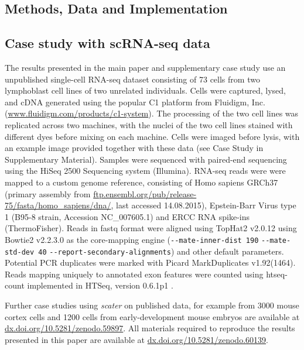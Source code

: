\documentclass{bioinfo}
\begin{document}
\begin{methods}
\section{Methods, Data and Implementation}\label{methods-data-and-implementation}

\subsection{Case study with scRNA-seq data}\label{case-study-with-scrna-seq-data}

The results presented in the main paper and supplementary case study use an unpublished single-cell RNA-seq dataset consisting of 73 cells from two lymphoblast cell lines of two unrelated individuals. Cells were captured, lysed, and cDNA generated using the popular C1 platform from Fluidigm, Inc. (\href{https://www.fluidigm.com/products/c1-system}{www.fluidigm.com/products/c1-system}). The processing of the two cell lines was replicated across two machines, with the nuclei of the two cell lines stained with different dyes before mixing on each machine. Cells were imaged before lysis, with an example image provided together with these data (see Case Study in Supplementary Material). Samples were sequenced with paired-end sequencing using the HiSeq 2500 Sequencing system (Illumina). RNA-seq reads were were mapped to a custom genome reference, consisting of Homo sapiens GRCh37 (primary assembly from \href{ftp://ftp.ensembl.org/pub/release-75/fasta/homo_sapiens/dna/}{ftp.ensembl.org/pub/release-75/fasta/homo\_sapiens/dna/}, last accessed 14.08.2015), Epstein-Barr Virus type 1 (B95-8 strain, Accession NC\_007605.1) and ERCC RNA spike-ins (ThermoFisher).  Reads in fastq format were aligned using TopHat2 v2.0.12 \citep{Kim2013-qb} using Bowtie2 v2.2.3.0 \citep{Langmead2012-yc} as the core-mapping engine (\verb|--mate-inner-dist 190| \verb|--mate-std-dev 40| \verb|--report-secondary-alignments|) and other default parameters. Potential PCR duplicates were marked with Picard MarkDuplicates v1.92(1464). Reads mapping uniquely to annotated exon features were counted using htseq-count implemented in HTSeq, version 0.6.1p1 \citep{Anders2015-wf}.

Further case studies using \emph{scater} on published data, for example from 3000 mouse cortex cells \citep{Zeisel2015-ab} and 1200 cells from early-development mouse embryos \citep{Scialdone2016-oa} are available at \href{http://dx.doi.org/10.5281/zenodo.59897}{dx.doi.org/10.5281/zenodo.59897}. All materials required to reproduce the results presented in this paper are available at \href{http://dx.doi.org/10.5281/zenodo.60139}{dx.doi.org/10.5281/zenodo.60139}.



\end{methods}
\end{document}
